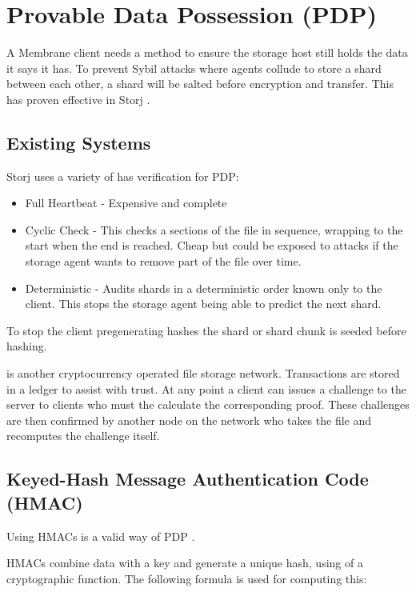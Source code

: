 \documentclass[11pt, a4paper, twoside]{report}
\begin{document}
\section{Provable Data Possession (PDP)} \label{sec:poo}

A Membrane client needs a method to ensure the storage host still holds the data it says it has. To prevent Sybil attacks where agents collude to store a shard between each other, a shard will be salted before encryption and transfer. This has proven effective in Storj \citep{Wilkinson14storja}.

\subsection{Existing Systems}

Storj uses a variety of has verification for PDP:

\begin{itemize}
 \item Full Heartbeat - Expensive and complete
 \item Cyclic Check - This checks a sections of the file in sequence, wrapping to the start when the end is reached. Cheap but could be exposed to attacks if the storage agent wants to remove part of the file over time.
 \item Deterministic - Audits shards in a deterministic order known only to the client. This stops the storage agent being able to predict the next shard.
\end{itemize}

To stop the client pregenerating hashes the shard or shard chunk is seeded before hashing.

\cite{filecoin2014filecoin} is another cryptocurrency operated file storage network. Transactions are stored in a ledger to assist with trust. At any point a client can issues a challenge to the server to clients who must the calculate the corresponding proof. These challenges are then confirmed by another node on the network who takes the file and recomputes the challenge itself.

\subsection{Keyed-Hash Message Authentication Code (HMAC)}

Using HMACs is a valid way of PDP \citep{ateniese2011remote}.

HMACs combine data with a key and generate a unique hash, using of a cryptographic function. \citep{krawczyk1997hmac} The following formula is used for computing this:
\end{document}
